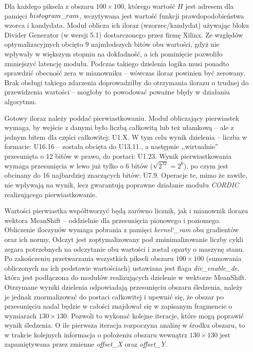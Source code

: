 Dla każdego piksela z obszaru $100 \times 100$, którego wartość $H$ jest adresem dla pamięci $histogram\char`_ram$, wczytywana jest wartość funkcji prawdopodobieństwa wzorca i kandydata. 
Moduł oblicza ich iloraz (wzorzec/kandydat) używając bloku Divider Generator (w wersji 5.1) dostarczonego przez firmę Xilinx. %
Ze względów optymalizacyjnych obcięto 9 najmłodszych bitów obu wartości, gdyż nie wpływały w większym stopniu na dokładność, a ich pominięcie pozwoliło zmniejszyć latencję modułu. %
Podczas takiego dzielenia logika musi ponadto sprawdzić obecność zera w mianowniku -- wówczas iloraz powinien być zerowany. 
Brak obsługi takiego zdarzenia doprowadziłby do otrzymania ilorazu o trudnej do przewidzenia wartości -- mogłoby to powodować poważne błędy w działaniu algorytmu. 

Gotowy iloraz należy poddać pierwiastkowaniu. 
Moduł obliczający pierwiastek wymaga, by wejście z danymi było liczbą całkowitą lub  też ułamkową -- ale z jednym bitem dla części całkowitej: U1.X. 
W tym celu wynik dzielenia -- liczba w formacie: U16.16 -- została obcięta do U13.11., a następnie ,,wirtualnie'' przesunięta o 12 bitów w prawo, do postaci: U1.23. 
Wynik pierwiastkowania wymaga przesunięcia w lewo już tylko o 6 bitów ($\sqrt{2^{12}}=2^6$), po czym jest obcinany do 16 najbardziej znaczących bitów: U7.9.
Operacje te, mimo że zawiłe, nie wpływają na wynik, lecz gwarantują poprawne działanie modułu \textit{CORDIC} realizującego pierwiastkowanie.

Wartości pierwiastka współtworzyć będą zarówno licznik, jak i mianownik ilorazu wektora MeanShift -- oddzielnie dla przesunięcia pionowego i poziomego. %
Obliczenie iloczynów wymaga pobrania z pamięci \textit{kernel\char`_ram} obu gradientów oraz ich normy. 
Odczyt jest zoptymalizowany pod zminimalizowanie liczby cykli zegara potrzebnych na odczytanie obu wartości i został oparty o maszynę stanu.
Po zakończeniu przetwarzania wszystkich pikseli obszaru $100 \times 100$ (sumowania obliczonych na ich podstawie wartościach) ustawiana jest flaga \textit{div\_enable\_de}, która jest podłączona do modułów realizujących dzielenie w wektorze MeanShift. Otrzymane wyniki dzielenia odpowiadają przesunięciu obszaru śledzenia, należy je jednak znormalizować do postaci całkowitej i upewnić się, że obszar po przesunięciu nadal będzie w całości znajdował się w zapisanym fragmencie o wymiarach $130 \times 130$. Pozwoli to wykonać kolejne iteracje, które mogą poprawić wynik śledzenia. O ile pierwsza iteracja rozpoczyna analizę w środku obszaru, to w trakcie kolejnych informacja o położeniu obszaru wewnątrz $130 \times 130$ jest zapamiętywana przez zmienne \textit{offset\_X} oraz \textit{offset\_Y}.


